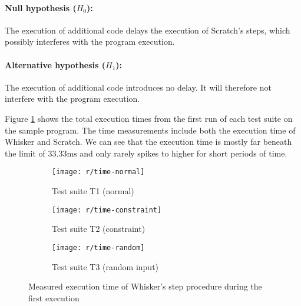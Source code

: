 \clearpage

\paragraph{Null hypothesis ($H_0$):}
The execution of additional code delays the execution of Scratch's steps, which possibly interferes with the program execution.
\vspace{-\medskipamount}
\paragraph{Alternative hypothesis ($H_1$):}
The execution of additional code introduces no delay. It will therefore not interfere with the program execution.
\parspace

\noindent Figure \ref{fig:time_line_plot} shows the total execution times
from the first run of each test suite on the sample program.
The time measurements include both the execution time of Whisker and Scratch.
We can see that the execution time is mostly far beneath the limit of $33.33\text{ms}$
and only rarely spikes to higher for short periods of time.
\parspace

\begin{figure}[htpb]
    \centering

    \begin{subfigure}{\textwidth}
        \centering
        \texttt{[image: r/time-normal]}
        \vspace{-\medskipamount}
        \caption{Test suite T1 (normal)}
    \end{subfigure}

    \begin{subfigure}{\textwidth}
        \centering
        \texttt{[image: r/time-constraint]}
        \vspace{-\medskipamount}
        \caption{Test suite T2 (constraint)}
    \end{subfigure}

    \begin{subfigure}{\textwidth}
        \centering
        \texttt{[image: r/time-random]}
        \vspace{-\medskipamount}
        \caption{Test suite T3 (random input)}
    \end{subfigure}

    \caption{Measured execution time of Whisker's step procedure during the first execution}
    \label{fig:time_line_plot}
\end{figure}

